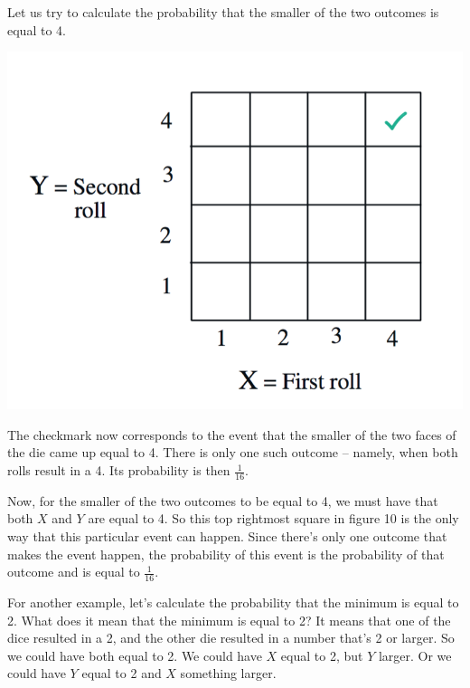 \documentclass{tufte-handout}
\begin{document}
Let us try to calculate the
probability that the smaller of the two outcomes is equal to 4.

\begin{marginfigure}
  \includegraphics{CheckMarkedDie2}
  \caption{The checkmark now corresponds to the event that the smaller of the two faces of the die came up equal to 4. There is only one such outcome -- namely, when both rolls result in a 4. Its probability is then $\frac{1}{16}.$ }
\end{marginfigure}

Now, for the smaller of the two outcomes to be equal to 4, we must have that both $X$ and $Y$ are equal to
4. So this top rightmost square in figure 10 is the only way that this particular event can happen. Since there's only one
outcome that makes the event happen, the probability of this event is the probability of that outcome
and is equal to $\frac{1}{16}$.

\pagebreak
For another example, let's calculate the probability that the minimum is equal to 2. What does it mean
that the minimum is equal to 2? It means that one of the dice resulted in a 2, and the other die resulted
in a number that's 2 or larger. So we could have both equal to 2. We could have $X$ equal to 2, but $Y$
larger. Or we could have $Y$ equal to 2 and $X$ something larger.
\end{document}
